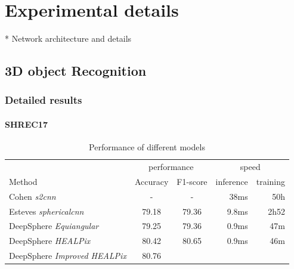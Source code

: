 \documentclass{article} %
\begin{document}
\section{Experimental details}

* Network architecture and details

\subsection{3D object Recognition}
\subsubsection*{Detailed results}
\paragraph*{SHREC17}

\begin{table}
    \centering
    \begin{tabular}{l|c c r r}
        \multicolumn{1}{l}{} & \multicolumn{2}{c}{performance} & \multicolumn{2}{c}{speed}\\
        \cmidrule(lr){2-3} \cmidrule(lr){4-5}
        \multicolumn{1}{l}{Method} & Accuracy & F1-score & inference & training \\ \hline
        Cohen \emph{s2cnn} & - & - & 38ms & 50h\\
        Esteves \emph{sphericalcnn} & 79.18 & 79.36 & 9.8ms & 2h52\\ \hline
        DeepSphere \emph{Equiangular} & 79.25 & 79.36 & 0.9ms & 47m \\
        DeepSphere \emph{HEALPix} & 80.42 & 80.65 & 0.9ms & 46m\\
        DeepSphere \emph{Improved HEALPix} & 80.76 & & &
    \end{tabular}
    \caption{Performance of different models}
    \label{tab:SHREC17_class}
\end{table}
\end{document}
